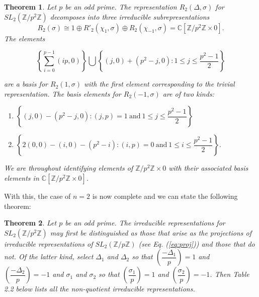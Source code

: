 \documentclass[12pt,reqno]{amsart}
\newtheorem{theorem}{Theorem}[section]
\theoremstyle{remark}
\numberwithin{table}{section}
\newcommand{\C}{\mathbb C}
\newcommand{\Z}{\mathbb Z}
\begin{document}
\begin{theorem}
Let $p$ be an odd prime.  The representation $R_2(\Delta,\sigma)$ for $SL_2(\Z/p^2 \Z)$ decomposes into three irreducible 
subrepresentations 
$$  R_2(\sigma) \cong 1\oplus R'_2(\chi_1, \sigma)  \oplus R_2(\chi_{-1}, \sigma)  = \C[\Z/p^2 \Z\times 0].$$
The elements 
\medskip

$$\left\{\sum_{i = 0}^{p-1} (ip,0)\right\} \bigcup \left\{ (j,0)+(p^2-j,0): 1\leq j\leq \frac{p^2-1}2 \right\}$$
\medskip

\noindent are a basis for $R_2(1, \sigma)$ with the first element corresponding to the trivial representation. The basis elements  for  $R_2(-1, \sigma)$ are of two kinds: 

\medskip

\begin{enumerate}
\item  $\left\{(j,0)-(p^2-j,0): (j,p)=1\ \textrm{and}\ 1\leq j\leq \dfrac{p^2-1}2\right\}$ 
\item $\left\{ 2(0,0)-(i,0)-(p^2-i):(i,p)=0\ \textrm{and}\ 1\leq i\leq \dfrac{p^2-1}2 \right\}.$
\end{enumerate}

\medskip

We are throughout identifying elements of $\Z/p^2 \Z\times 0$ with their associated basis elements in $\C[\Z/p^2 \Z\times 0]$. %
\end{theorem}


\medskip

With this, the case of $n=2$ is now complete and we can state the following theorem: 

\medskip

\begin{theorem} Let $p$ be an odd prime. The irreducible representations for $SL_2(\Z/p^2 \Z)$ may first be distinguished as those that arise as the projections of irreducible representations of $SL_2(\Z/p \Z)$ (see Eq. (\ref{eq:proj})) and those that do not. Of the latter kind, select $\Delta_1$ and $\Delta_2$ so that $\left(\dfrac{-\Delta_1}p\right)=1$ and $\left(\dfrac{-\Delta_2}p\right)=-1$ and $\sigma_1$ and $\sigma_2$ so that $\left(\dfrac{\sigma_1}p\right)=1$ and $\left(\dfrac{\sigma_2}p\right)=-1$. Then Table 2.2 %
below lists all the non-quotient irreducible representations. 
 \end{theorem}
 
 
\end{document}
